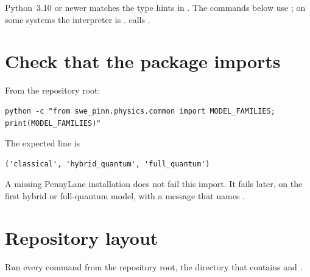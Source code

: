 Python~3.10 or newer matches the type hints in .
The commands below use ; on some systems the interpreter is .
 calls .

\section{Check that the package imports}

From the repository root:

\begin{lstlisting}[style=sh]
python -c "from swe_pinn.physics.common import MODEL_FAMILIES; print(MODEL_FAMILIES)"
\end{lstlisting}

The expected line is

\begin{lstlisting}[style=sh]
('classical', 'hybrid_quantum', 'full_quantum')
\end{lstlisting}

A missing PennyLane installation does not fail this import.
It fails later, on the first hybrid or full-quantum model, with a message that names .

\section{Repository layout}

Run every command from the repository root, the directory that contains  and .

